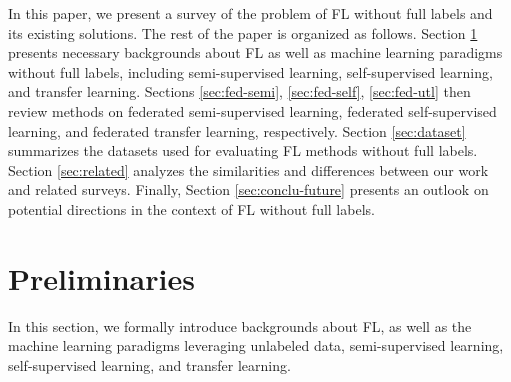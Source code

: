 \documentclass[11pt]{article}
\begin{document}
In this paper, we present a survey of the problem of FL without full labels and its existing solutions. The rest of the paper is organized as follows. Section \ref{sec:prelim} presents necessary backgrounds about FL as well as machine learning paradigms without full labels, including semi-supervised learning, self-supervised learning, and transfer learning. Sections \ref{sec:fed-semi}, \ref{sec:fed-self}, \ref{sec:fed-utl} then review methods on federated semi-supervised learning, federated self-supervised learning, and federated transfer learning, respectively. Section \ref{sec:dataset} summarizes the datasets used for evaluating FL methods without full labels. Section \ref{sec:related} analyzes the similarities and differences between our work and related surveys. Finally, Section \ref{sec:conclu-future} presents an outlook on potential directions in the context of FL without full labels. 



\section{Preliminaries}\label{sec:prelim}
In this section, we formally introduce backgrounds about FL, as well as the machine learning paradigms leveraging unlabeled data, semi-supervised learning, self-supervised learning, and transfer learning. 
\end{document}

